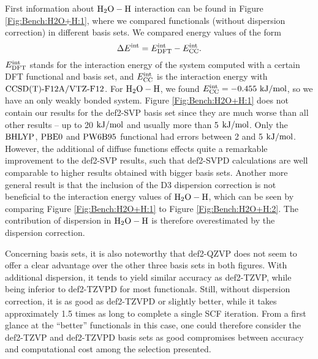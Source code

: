\documentclass[8.5pt,twoside,twocolumn]{article}
\newcommand\eint{\enmat{E^{\te{int}}}}
\newcommand\dft{\enmat{_{\te{DFT}}}}
\newcommand\kmo{\enmat{\te {kJ/mol}}}
\theoremstyle{standard}
\begin{document}
First information about $\text H _2 \text O-\text H$ interaction can be found in Figure \ref{Fig:Bench:H2O+H:1}, where
we compared functionals (without dispersion correction) in different basis sets. We compared
energy values of the form
\newcommand\ecc{\enmat{\eint_{\te {CC}}}}
\begin{equation}
\Dl\eint=\eint\dft-\ecc.
\label{Bench:RefEnergy}
\end{equation}
$\eint\dft$ stands for the interaction energy of the system computed with a certain
DFT functional and basis set, and $\ecc$ is the interaction energy with $\text{CCSD(T)-F12A}/\text{VTZ-F}12$.
For $\text H _2 \text O-\text H$, we found $\ecc=-0.455 \te{ kJ/mol}$, so we have an only
weakly bonded system. Figure \ref{Fig:Bench:H2O+H:1} does not contain our results
for the def2-SVP basis set since they are much worse than all other results --
up to 20 $\kmo$ and usually more than 5 $\kmo$. Only the $\text{BHLYP}$, $\text{PBE0}$ and
$\text{PW6B95}$ functional had errors between 2 and 5 $\kmo$. However,
the additional of diffuse functions effects quite a remarkable improvement to the
def2-SVP results, such that def2-SVPD calculations are well comparable to higher
results obtained with bigger basis sets. Another more general result is that the inclusion
of the D3 dispersion correction is not beneficial to the interaction
energy values of $\text H _2 \text O-\text H$, which can be seen by comparing Figure \ref{Fig:Bench:H2O+H:1}
to Figure \ref{Fig:Bench:H2O+H:2}. The contribution of dispersion in $\text H _2 \text O-\text H$
is therefore overestimated by the dispersion correction.

Concerning basis sets, it is also
noteworthy that def2-QZVP does not seem to offer a clear advantage over the
other three basis sets in both figures. With additional dispersion,
it tends to yield similar accuracy as def2-TZVP, while being inferior
to def2-TZVPD for most functionals. Still, without dispersion correction,
it is as good as def2-TZVPD or slightly better, while it takes approximately
1.5 times as long to complete a single SCF iteration. From a first glance
at the ``better'' functionals in this case, one could therefore consider
the def2-TZVP and def2-TZVPD basis sets as good compromises between
accuracy and computational cost among the selection presented. 
\end{document}
